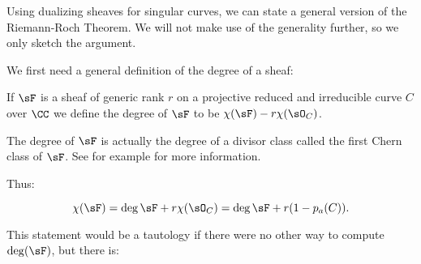 Using dualizing sheaves for singular curves, we can
state a general version of the Riemann-Roch Theorem.  We will not make use of the generality further, so we only sketch the argument.

We first need a general definition of the degree of a sheaf:

\begin{definition}
 If $\sF$ is a sheaf of generic rank $r$ on a projective reduced and irreducible curve $C$ over $\CC$ we define the degree
 of $\sF$ to be $\chi(\sF) -r\chi(\sO_C)$.
\end{definition}

\begin{fact}
The degree of $\sF$ is actually the degree of a divisor class called the first Chern class of $\sF$. See
for example \cite[Chapter ***]{3264}
for more information. 
\end{fact}

Thus:
\begin{theorem}\label{general RR without duality}
$$
 \chi(\sF) = \deg \sF + r\chi(\sO_C) = \deg \sF + r(1-p_a(C)).
 $$
\end{theorem}
 
This statement would be
a tautology if there were no other way to compute $\deg(\sF)$, but there is:


